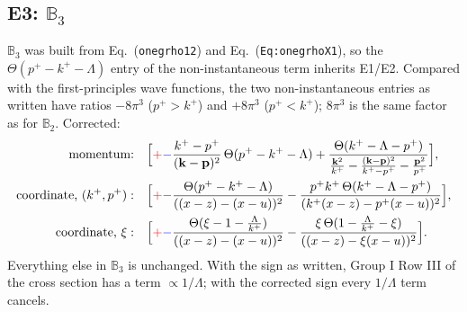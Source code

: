 \documentclass[10pt]{article}
\def\mf#1{\mathbb{#1}}
\def\v#1{\mathbf{#1}}
\newcommand{\old}[1]{{\color{red}#1}}
\newcommand{\new}[1]{{\color{blue}#1}}
\newcommand{\eqn}[1]{Eq.~(\texttt{#1})}
\begin{document}
\subsection{E3: $\mf B_3$}
$\mf B_3$ was built from \eqn{onegrho12} and \eqn{Eq:onegrhoX1}, so the $\Theta(p^+-k^+-\Lambda)$ entry of the non-instantaneous term inherits E1/E2. Compared with the first-principles wave functions, the two non-instantaneous entries as written have ratios $-8\pi^3$ ($p^+>k^+$) and $+8\pi^3$ ($p^+<k^+$); $8\pi^3$ is the same factor as for $\mf B_2$. Corrected:
\begin{align}
\text{momentum:}\quad&\Big[\old{+}\new{-}\frac{k^+-p^+}{(\v k-\v p)^2}\,\Theta(p^+-k^+-\Lambda)+\frac{\Theta(k^+-\Lambda-p^+)}{\frac{\v k^2}{k^+}-\frac{(\v k-\v p)^2}{k^+-p^+}-\frac{\v p^2}{p^+}}\Big],\\
\text{coordinate, }(k^+,p^+):\quad&\Big[\old{+}\new{-}\frac{\Theta(p^+-k^+-\Lambda)}{((x-z)-(x-u))^2}-\frac{p^+k^+\,\Theta(k^+-\Lambda-p^+)}{(k^+(x-z)-p^+(x-u))^2}\Big],\\
\text{coordinate, }\xi:\quad&\Big[\old{+}\new{-}\frac{\Theta(\xi-1-\frac{\Lambda}{k^+})}{((x-z)-(x-u))^2}-\frac{\xi\,\Theta(1-\frac{\Lambda}{k^+}-\xi)}{((x-z)-\xi(x-u))^2}\Big].
\end{align}
Everything else in $\mf B_3$ is unchanged. With the sign as written, Group I Row III of the cross section has a term $\propto1/\Lambda$; with the corrected sign every $1/\Lambda$ term cancels.
\end{document}
